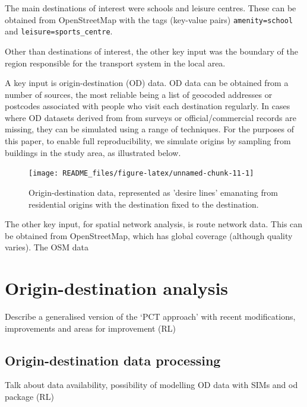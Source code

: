 \documentclass[galley]{jtlu-article-2col}
\begin{document}
The main destinations of interest were schools and leisure centres.
These can be obtained from OpenStreetMap with the tags (key-value pairs) \texttt{amenity=school} and \texttt{leisure=sports\_centre}.

Other than destinations of interest, the other key input was the boundary of the region responsible for the transport system in the local area.

A key input is origin-destination (OD) data.
OD data can be obtained from a number of sources, the most reliable being a list of geocoded addresses or postcodes associated with people who visit each destination regularly.
In cases where OD datasets derived from from surveys or official/commercial records are missing, they can be simulated using a range of techniques.
For the purposes of this paper, to enable full reproducibility, we simulate origins by sampling from buildings in the study area, as illustrated below.

\begin{figure}

{\centering \texttt{[image: README\_files/figure-latex/unnamed-chunk-11-1]} 

}

\caption{Origin-destination data, represented as 'desire lines' emanating from residential origins with the destination fixed to the destination.}\label{fig:unnamed-chunk-11}
\end{figure}

The other key input, for spatial network analysis, is route network data.
This can be obtained from OpenStreetMap, which has global coverage (although quality varies).
The OSM data

\hypertarget{origin-destination-analysis}{%
\section{Origin-destination analysis}\label{origin-destination-analysis}}

Describe a generalised version of the `PCT approach' with recent modifications, improvements and areas for improvement (RL)

\hypertarget{origin-destination-data-processing}{%
\subsection{Origin-destination data processing}\label{origin-destination-data-processing}}

Talk about data availability, possibility of modelling OD data with SIMs and od package (RL)
\end{document}
